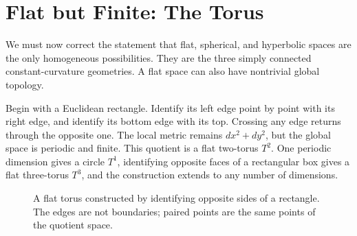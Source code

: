 \section{Flat but Finite: The Torus}

We must now correct the statement that flat, spherical, and hyperbolic spaces are the only homogeneous possibilities. They are the three simply connected constant-curvature geometries. A flat space can also have nontrivial global topology.

Begin with a Euclidean rectangle. Identify its left edge point by point with its right edge, and identify its bottom edge with its top. Crossing any edge returns through the opposite one. The local metric remains \(dx^2+dy^2\), but the global space is periodic and finite. This quotient is a flat two-torus \(T^2\). One periodic dimension gives a circle \(T^1\), identifying opposite faces of a rectangular box gives a flat three-torus \(T^3\), and the construction extends to any number of dimensions.

\begin{figure}[htbp]
\centering
{}
\caption{A flat torus constructed by identifying opposite sides of a rectangle. The edges are not boundaries; paired points are the same points of the quotient space.}
\label{fig:c03-flat-torus}
\end{figure}

\begin{classroomqa}
\end{classroomqa}


